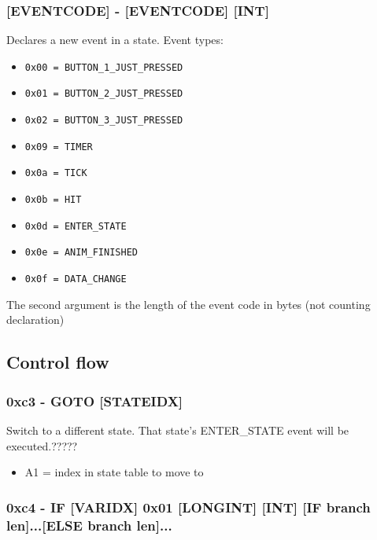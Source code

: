 \documentclass[12pt]{scrbook}
\begin{document}
\subsubsection{[EVENTCODE] - [EVENTCODE] [INT]}
Declares a new event in a state.
Event types:
\begin{itemize}
\item \texttt{0x00 = BUTTON\_1\_JUST\_PRESSED}
\item \texttt{0x01 = BUTTON\_2\_JUST\_PRESSED}
\item \texttt{0x02 = BUTTON\_3\_JUST\_PRESSED}
\item \texttt{0x09 = TIMER}
\item \texttt{0x0a = TICK}
\item \texttt{0x0b = HIT}
\item \texttt{0x0d = ENTER\_STATE}
\item \texttt{0x0e = ANIM\_FINISHED}
\item \texttt{0x0f = DATA\_CHANGE}
\end{itemize}
The second argument is the length of the event code in bytes (not counting declaration)

\subsection{Control flow}

\subsubsection{0xc3 - GOTO [STATEIDX]}
Switch to a different state.  That state's ENTER\_STATE event will be executed.?????
\begin{itemize}
\item A1 = index in state table to move to
\end{itemize}

\subsubsection{0xc4 - IF [VARIDX] 0x01 [LONGINT] [INT] [IF branch len]...[ELSE branch len]...}
\end{document}
